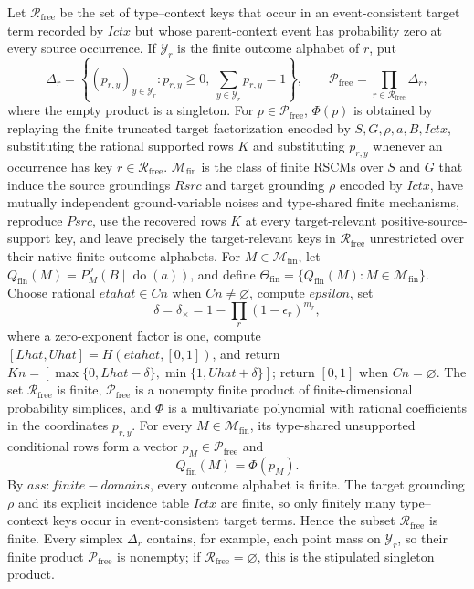 Let \(\mathcal R_{\mathrm{free}}\) be the set of type--context keys that occur in an event-consistent target term recorded by \(Ictx\) but whose parent-context event has probability zero at every source occurrence.  If \(\mathcal Y_r\) is the finite outcome alphabet of \(r\), put
\[
 \Delta_r=\left\{(p_{r,y})_{y\in\mathcal Y_r}:p_{r,y}\geq0,\ \sum_{y\in\mathcal Y_r}p_{r,y}=1\right\},
 \qquad
 \mathcal P_{\mathrm{free}}=\prod_{r\in\mathcal R_{\mathrm{free}}}\Delta_r,
\]
where the empty product is a singleton.
For \(p\in\mathcal P_{\mathrm{free}}\), \(\Phi(p)\) is obtained by replaying the finite truncated target factorization encoded by \(S,G,\rho,a,B,Ictx\), substituting the rational supported rows \(K\) and substituting \(p_{r,y}\) whenever an occurrence has key \(r\in\mathcal R_{\mathrm{free}}\).
\(\mathcal M_{\mathrm{fin}}\) is the class of finite RSCMs over \(S\) and \(G\) that induce the source groundings \(Rsrc\) and target grounding \(\rho\) encoded by \(Ictx\), have mutually independent ground-variable noises and type-shared finite mechanisms, reproduce \(Psrc\), use the recovered rows \(K\) at every target-relevant positive-source-support key, and leave precisely the target-relevant keys in \(\mathcal R_{\mathrm{free}}\) unrestricted over their native finite outcome alphabets.
For \(M\in\mathcal M_{\mathrm{fin}}\), let \(Q_{\mathrm{fin}}(M)=P_M^{\rho}(B\mid\operatorname{do}(a))\), and define \(\Theta_{\mathrm{fin}}=\{Q_{\mathrm{fin}}(M):M\in\mathcal M_{\mathrm{fin}}\}\).
Choose rational \(etahat\in Cn\) when \(Cn\neq\varnothing\), compute \(epsilon\), set
\[
 \delta=\delta_{\times}=1-\prod_r(1-\epsilon_r)^{m_r},
\]
where a zero-exponent factor is one, compute \([Lhat,Uhat]=H(etahat,[0,1])\), and return \(Kn=[\max\{0,Lhat-\delta\},\min\{1,Uhat+\delta\}]\); return \([0,1]\) when \(Cn=\varnothing\).
The set \(\mathcal R_{\mathrm{free}}\) is finite, \(\mathcal P_{\mathrm{free}}\) is a nonempty finite product of finite-dimensional probability simplices, and \(\Phi\) is a multivariate polynomial with rational coefficients in the coordinates \(p_{r,y}\).  For every \(M\in\mathcal M_{\mathrm{fin}}\), its type-shared unsupported conditional rows form a vector \(p_M\in\mathcal P_{\mathrm{free}}\) and
\[
 Q_{\mathrm{fin}}(M)=\Phi(p_M).
\]
By \(ass:finite-domains\), every outcome alphabet is finite.  The target grounding \(\rho\) and its explicit incidence table \(Ictx\) are finite, so only finitely many type--context keys occur in event-consistent target terms.  Hence the subset \(\mathcal R_{\mathrm{free}}\) is finite.  Every simplex \(\Delta_r\) contains, for example, each point mass on \(\mathcal Y_r\), so their finite product \(\mathcal P_{\mathrm{free}}\) is nonempty; if \(\mathcal R_{\mathrm{free}}=\varnothing\), this is the stipulated singleton product.

